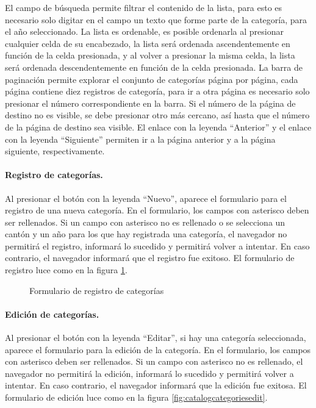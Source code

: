 \documentclass[a4paper, 9pt, conference]{article}              %
\begin{document}
El campo de b\'usqueda permite filtrar el contenido de la lista, para esto es necesario solo digitar en el campo un texto que forme parte de la categor\'ia, para el a\~no seleccionado. La lista es ordenable, es posible ordenarla al presionar cualquier celda de su encabezado, la lista ser\'a ordenada ascendentemente en funci\'on de la celda presionada, y al volver a presionar la misma celda, la lista ser\'a ordenada descendentemente en funci\'on de la celda presionada. La barra de paginaci\'on permite explorar el conjunto de categor\'ias p\'agina por p\'agina, cada p\'agina contiene diez registros de categor\'ia, para ir a otra p\'agina es necesario solo presionar el n\'umero correspondiente en la barra. Si el n\'umero de la p\'agina de destino no es visible, se debe presionar otro m\'as cercano, as\'i hasta que el n\'umero de la p\'agina de destino sea visible. El enlace con la leyenda ``Anterior'' y el enlace con la leyenda ``Siguiente'' permiten ir a la p\'agina anterior y a la p\'agina siguiente, respectivamente.

\paragraph{Registro de categor\'ias.}

Al presionar el bot\'on con la leyenda ``Nuevo'', aparece el formulario para el registro de una nueva categor\'ia. En el formulario, los campos con asterisco deben ser rellenados. Si un campo con asterisco no es rellenado o se selecciona un cant\'on y un a\~no para los que hay registrada una categor\'ia, el navegador no permitir\'a el registro, informar\'a lo sucedido y permitir\'a volver a intentar. En caso contrario, el navegador informar\'a que el registro fue exitoso. El formulario de registro luce como en la figura \ref{fig:catalogcategoriesnew}.

\begin{figure}
	\centering
		\caption{Formulario de registro de categor\'ias}
	\label{fig:catalogcategoriesnew}
\end{figure}

\paragraph{Edici\'on de categor\'ias.}

Al presionar el bot\'on con la leyenda ``Editar'', si hay una categor\'ia seleccionada, aparece el formulario para la edici\'on de la categor\'ia. En el formulario, los campos con asterisco deben ser rellenados. Si un campo con asterisco no es rellenado, el navegador no permitir\'a la edici\'on, informar\'a lo sucedido y permitir\'a volver a intentar. En caso contrario, el navegador informar\'a que la edici\'on fue exitosa. El formulario de edici\'on luce como en la figura \ref{fig:catalogcategoriesedit}.
\end{document}
